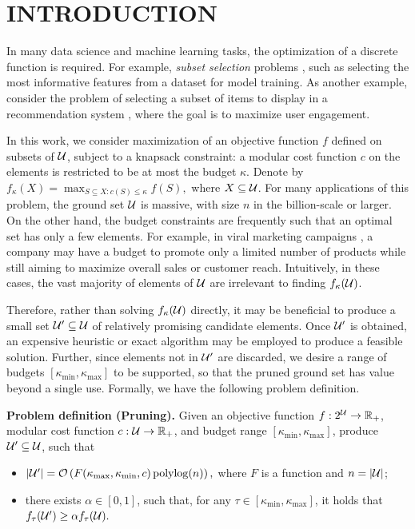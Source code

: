 \section{INTRODUCTION}
In many data science and machine learning
tasks, the optimization of a discrete function
is required. For example, \textit{subset selection}
problems \citep{Wei2015,Kim2020}, 
such as selecting the most informative features from a dataset for model training.
As another example, consider the problem of selecting a subset of items to display
in a recommendation system \citep{Mehrotra2023,Ko2022}, where the goal is to maximize user engagement.

In this work, we consider maximization of an
objective function $f$ defined on subsets
of $\mathcal{U}$, subject to a
knapsack constraint: a modular
cost function $c$ on the elements
is restricted to be at most the budget $\kappa$.
Denote by
$f_{\kappa}(X) = \max_{S \subseteq X : c(S)\le \kappa } f(S),$
where $X \subseteq \mathcal{U}$. 
For many applications of this problem, the ground
set $\mathcal{U}$ is massive, with size $n$ in the billion-scale
or larger. On the other hand, the budget constraints
are frequently such that an optimal set has only a few elements.
For example,
in viral marketing campaigns \citep{Kempe2003a},
a company may have a budget to promote
only a limited number of products while still aiming to
maximize overall sales or customer reach.
Intuitively, in these cases, the vast majority of elements of $\mathcal{U}$ are irrelevant
to finding $f_{\kappa}(\mathcal{U})$.

Therefore, rather than solving $f_{\kappa}(\mathcal{U})$ directly,
it may be beneficial to produce a small set $\mathcal{U}' \subseteq \mathcal{U}$
of relatively promising candidate elements. Once $\mathcal{U}'$
is obtained, an expensive
heuristic or exact algorithm may be employed to produce a feasible
solution.
Further, since elements not in $\mathcal{U}'$ are discarded,
we desire a range of budgets $[\kappa_{\min}, \kappa_{\max}]$
to be supported, so that the pruned
ground set has value beyond a single use.
Formally, we have the following problem definition.

\textbf{Problem definition (Pruning).}
Given an objective function $f: 2^{\mathcal{U}} \to \mathbb{R}_+$,
modular cost function $c: \mathcal{U} \to \mathbb{R}_+$,
and budget range $[\kappa_{\min}, \kappa_{\max}]$,
produce $\mathcal{U}' \subseteq \mathcal{U}$,
such that
\begin{itemize}
\item $|\mathcal{U}'| = \mathcal{O}\left(  F( \kappa_{\max}, \kappa_{\min}, c ) \operatorname*{polylog}(n) \right),$ where $F$ is a function and $n = |\mathcal{U} |$; 
\item there exists $\alpha \in [0,1]$, such that, for any $\tau \in [\kappa_{\min}, \kappa_{\max}]$,
  it holds that $f_{\tau}( \mathcal{U}' ) \ge \alpha f_{\tau }( \mathcal{U} ).$
\end{itemize}

